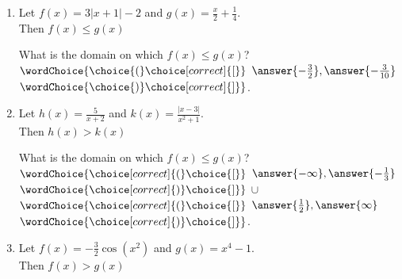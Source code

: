 \documentclass{ximera}
\author{Elizabeth Campolongo}
\begin{document}
\begin{exercise}
%
\begin{enumerate}

\item Let $f(x) = 3|x+1|-2$ and $g(x) = \frac{x}{2} + \frac{1}{4}$. \\
Then $f(x) \leq g(x)$ 
\begin{multipleChoice}
\end{multipleChoice}
\begin{exercise}
What is the domain on which $f(x) \leq g(x)$?\\
$\wordChoice{\choice{(}\choice[correct]{[}}$ $\answer{-\frac{3}{2}} , \answer{-\frac{3}{10}}$ 
$\wordChoice{\choice{)}\choice[correct]{]}}$.
\end{exercise}

\item Let $h(x) = \frac{5}{x+2}$ and $k(x) = \frac{|x-3|}{x^2+1}$.\\
Then $h(x) > k(x)$ 
\begin{multipleChoice}
\end{multipleChoice}
\begin{exercise}
What is the domain on which $f(x) \leq g(x)$?\\
$\wordChoice{\choice[correct]{(}\choice{[}}$ $\answer{-\infty} , \answer{-\frac{1}{3}}$ 
$\wordChoice{\choice[correct]{)}\choice{]}}$
$\cup$
$\wordChoice{\choice[correct]{(}\choice{[}}$ $\answer{\frac{1}{2}} , \answer{\infty}$ 
$\wordChoice{\choice[correct]{)}\choice{]}}$.
\end{exercise}

\item Let $f(x) = -\frac{3}{2}\cos(x^2)$ and $g(x) = x^4-1$. \\
Then $f(x) > g(x)$ 
\begin{multipleChoice}
\end{multipleChoice}

\end{enumerate}

\end{exercise}
\end{document}
